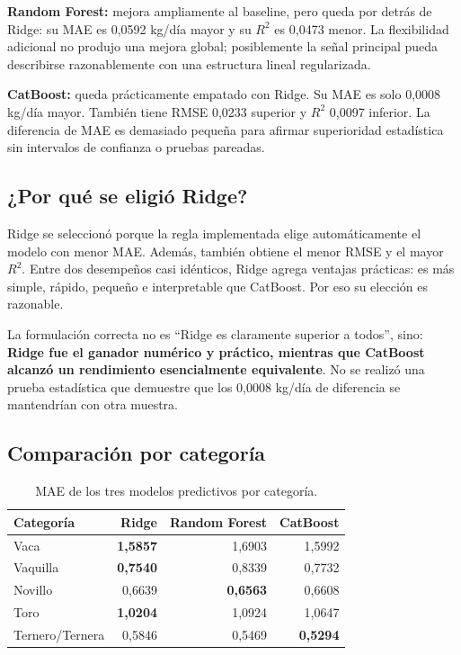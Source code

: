 \documentclass[11pt,a4paper]{article}
\begin{document}
\textbf{Random Forest:} mejora ampliamente al baseline, pero queda por detrás de Ridge: su MAE es 0,0592 kg/día mayor y su $R^2$ es 0,0473 menor. La flexibilidad adicional no produjo una mejora global; posiblemente la señal principal pueda describirse razonablemente con una estructura lineal regularizada.

\textbf{CatBoost:} queda prácticamente empatado con Ridge. Su MAE es solo 0,0008 kg/día mayor. También tiene RMSE 0,0233 superior y $R^2$ 0,0097 inferior. La diferencia de MAE es demasiado pequeña para afirmar superioridad estadística sin intervalos de confianza o pruebas pareadas.

\subsection{¿Por qué se eligió Ridge?}

Ridge se seleccionó porque la regla implementada elige automáticamente el modelo con menor MAE. Además, también obtiene el menor RMSE y el mayor $R^2$. Entre dos desempeños casi idénticos, Ridge agrega ventajas prácticas: es más simple, rápido, pequeño e interpretable que CatBoost. Por eso su elección es razonable.

La formulación correcta no es ``Ridge es claramente superior a todos'', sino: \textbf{Ridge fue el ganador numérico y práctico, mientras que CatBoost alcanzó un rendimiento esencialmente equivalente}. No se realizó una prueba estadística que demuestre que los 0,0008 kg/día de diferencia se mantendrían con otra muestra.

\subsection{Comparación por categoría}

\begin{table}[H]
\centering
\caption{MAE de los tres modelos predictivos por categoría.}
\begin{tabular}{lrrr}
\toprule
\textbf{Categoría} & \textbf{Ridge} & \textbf{Random Forest} & \textbf{CatBoost}\\
\midrule
Vaca & \textbf{1,5857} & 1,6903 & 1,5992\\
Vaquilla & \textbf{0,7540} & 0,8339 & 0,7732\\
Novillo & 0,6639 & \textbf{0,6563} & 0,6608\\
Toro & \textbf{1,0204} & 1,0924 & 1,0647\\
Ternero/Ternera & 0,5846 & 0,5469 & \textbf{0,5294}\\
\bottomrule
\end{tabular}
\end{table}
\end{document}

